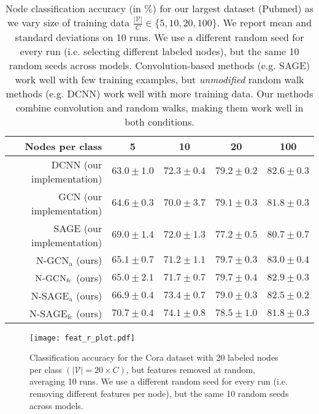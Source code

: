 \begin{table*}[t]
	\begin{center}
\begin{tabular}{rcccc}
 \textbf{Nodes per class} & 5 & 10 & 20 & 100 \\
\hline
DCNN (our implementation) & $63.0 \pm 1.0$ & $72.3 \pm 0.4$ & $79.2 \pm 0.2$ & $82.6 \pm 0.3$ \\
GCN (our implementation) & $64.6 \pm 0.3$ & $70.0 \pm 3.7$ & $79.1 \pm 0.3$ & $81.8 \pm 0.3$ \\
SAGE (our implementation) & $69.0 \pm 1.4$ & $72.0 \pm 1.3$ & $77.2 \pm 0.5$ & $80.7 \pm 0.7$ \\
\hline 

$\textrm{N-GCN}_\textrm{a}$ (ours) & $65.1 \pm 0.7$ & $71.2 \pm 1.1$ & $\mathbf{79.7} \pm 0.3$ & $\mathbf{83.0} \pm 0.4$ \\
$\textsc{N-GCN}_\textrm{fc}$ (ours) & $65.0 \pm 2.1$ & $71.7 \pm 0.7$ & $\mathbf{79.7} \pm 0.4$ & $82.9 \pm 0.3$ \\
$\textrm{N-SAGE}_\textrm{a}$ (ours) & $66.9 \pm 0.4$ & $73.4 \pm 0.7$ & $79.0 \pm 0.3$ & $82.5 \pm 0.2$ \\
$\textrm{N-SAGE}_\textrm{fc}$ (ours) & $\mathbf{70.7} \pm 0.4$ & $\mathbf{74.1} \pm 0.8$ & $78.5 \pm 1.0$ & $81.8 \pm 0.3$ \\
\end{tabular}
 \end{center}
\caption{Node classification accuracy (in $\%$) for our largest dataset (Pubmed) as we vary size of training data $\frac{|\mathcal{V}|}{C} \in \{5, 10, 20, 100\}$. We report mean and standard deviations on 10 runs.
We use a different random seed for every run (i.e. selecting different labeled nodes), but the same 10 random seeds across models.
Convolution-based methods (e.g. SAGE) work well with few training examples, but \textit{unmodified} random walk methods (e.g. DCNN) work well with more training data. Our methods combine convolution and random walks, making them work well in both conditions. 
}
\label{table:npc}
\end{table*}

\begin{figure*}[t]
	\centering
	\texttt{[image: feat\_r\_plot.pdf]}
	\caption{
		Classification accuracy for the Cora dataset with 20 labeled nodes per class $(|\mathcal{V}| = 20\times C)$, but features removed at random, averaging 10 runs.
		We use a different random seed for every run (i.e. removing different features per node), but the same 10 random seeds across models.
	}
	\label{fig:featremoval}
\end{figure*}

